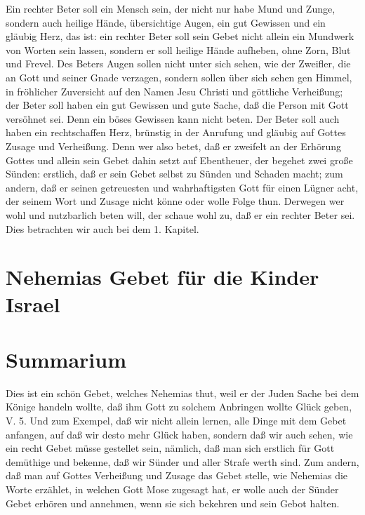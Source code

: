 Ein rechter Beter soll ein Mensch sein, der nicht nur habe Mund und Zunge, sondern auch heilige Hände, übersichtige Augen, ein gut Gewissen und ein gläubig Herz, das ist: ein rechter Beter soll sein Gebet nicht allein ein Mundwerk von Worten sein lassen, sondern er soll heilige Hände aufheben, ohne Zorn, Blut und Frevel. Des Beters Augen sollen nicht unter sich sehen, wie der Zweifler, die an Gott und seiner Gnade verzagen, sondern sollen über sich sehen gen Himmel, in fröhlicher Zuversicht auf den Namen Jesu Christi und göttliche Verheißung; der Beter soll haben ein gut Gewissen und gute Sache, daß die Person mit Gott versöhnet sei. Denn ein böses Gewissen kann nicht beten. Der Beter soll auch haben ein rechtschaffen Herz, brünstig in der Anrufung und gläubig auf Gottes Zusage und Verheißung. Denn wer also betet, daß er zweifelt an der Erhörung Gottes und allein sein Gebet dahin setzt auf Ebentheuer, der begehet zwei große Sünden: erstlich, daß er sein Gebet selbst zu Sünden und Schaden macht; zum andern, daß er seinen getreuesten und wahrhaftigsten Gott für einen Lügner acht, der seinem Wort und Zusage nicht könne oder wolle Folge thun. Derwegen wer wohl und nutzbarlich beten will, der schaue wohl zu, daß er ein rechter Beter sei. Dies betrachten wir auch bei dem 1. Kapitel.

\section{Nehemias Gebet für die Kinder Israel}


\section{Summarium}

Dies ist ein schön Gebet, welches Nehemias thut, weil er der Juden Sache bei dem Könige handeln wollte, daß ihm Gott zu solchem Anbringen wollte Glück geben, V. 5. Und zum Exempel, daß wir nicht allein lernen, alle Dinge mit dem Gebet anfangen, auf daß wir desto mehr Glück haben, sondern daß wir auch sehen, wie ein recht Gebet müsse gestellet sein, nämlich, daß man sich erstlich für Gott demüthige und bekenne, daß wir Sünder und aller Strafe werth sind. Zum andern, daß man auf Gottes Verheißung und Zusage das Gebet stelle, wie Nehemias die Worte erzählet, in welchen Gott Mose zugesagt hat, er wolle auch der Sünder Gebet erhören und annehmen, wenn sie sich bekehren und sein Gebot halten.

